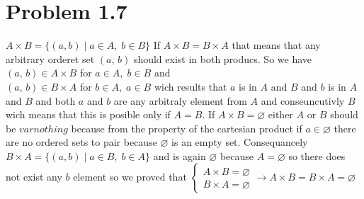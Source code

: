 \documentclass[12pt]{article}
\begin{document}
\section*{Problem 1.7}
$A \times B = \{(a, b) \;|\; a \in A,\; b \in B\}$
If $A \times B = B \times A$ that means that any arbitrary orderet set $(a,\,b)$ should exist in both producs. So we have $(a,\,b) \in A \times B$ for $a \in A, \; b \in B$ and \\ $(a,\,b) \in B \times A$ for $b \in A, \; a \in B$ wich results that $a$ is in $A$ and $B$ and $b$ is in $A$ and $B$ and both $a$ and $b$ are any arbitraly element from $A$ and conseuncutivly $B$ wich means that this is posible only if $A=B$.
 If $A \times B = \varnothing$ either $A$ or $B$ should be $varnothing$ because from the property of the cartesian product if $a \in \varnothing$ there are no ordered sets to pair because $\varnothing$ is an empty set. Consequancely   $B \times A = \{(a, b) \;|\; a \in B,\; b \in A\}$ and is again $\varnothing$ because $A=\varnothing$ so there does not exist any $b$ element so we proved that 
 $
\begin{cases}
  A \times B = \varnothing \\
  B \times A = \varnothing
\end{cases} \rightarrow A \times B = B \times A = \varnothing
 $
\newpage
\end{document}
